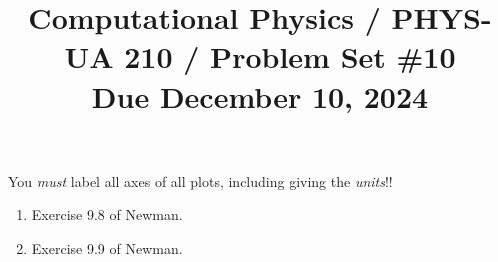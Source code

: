 \documentclass[11pt, preprint]{aastex}
\begin{document}
\title{\bf Computational Physics / PHYS-UA 210 / Problem Set \#10
\\ Due December 10, 2024}

You {\it must} label all axes of all plots, including giving the {\it
  units}!!

\begin{enumerate}
  \item Exercise 9.8 of Newman.
  \item Exercise 9.9 of Newman.
\end{enumerate}
\end{document}
